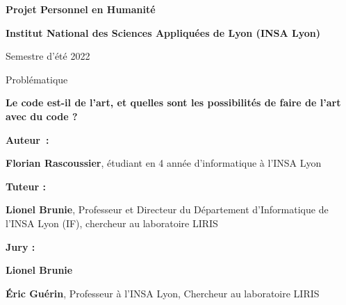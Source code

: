 \begin{titlepage}
    \begin{center}
        \vspace{1cm}
        \Large
        \textbf{Projet Personnel en Humanité}

        \vspace{0.5cm}
        \normalsize
        \textbf{Institut National des Sciences Appliquées de Lyon (INSA Lyon)}

        \normalsize
        Semestre d'été 2022

        \vspace{2cm}
        \Large
        Problématique

        \textbf{Le code est-il de l'art, et quelles sont les possibilités de faire de l'art avec du code ?}

        \vfill

        \Large
        \textbf{Auteur :} \par
        \normalsize
        \textbf{Florian Rascoussier}, étudiant en 4 année d'informatique à l'INSA Lyon

        \Large
        \textbf{Tuteur :} \par
        \normalsize
        \textbf{Lionel Brunie}, Professeur et Directeur du Département d'Informatique de l'INSA Lyon (IF), chercheur au laboratoire LIRIS

        \Large
        \textbf{Jury :} \par
        \normalsize
        \textbf{Lionel Brunie}

        \textbf{Éric Guérin}, Professeur à l'INSA Lyon, Chercheur au laboratoire LIRIS
            
    \end{center}
\end{titlepage}